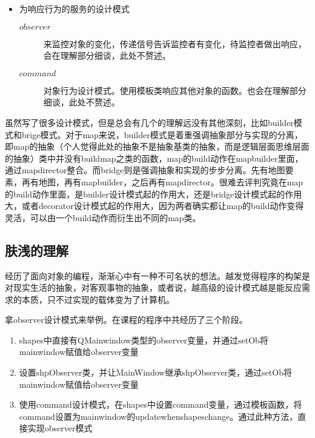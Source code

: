 \documentclass[a4paper,16pt,UTF8]{article}
\begin{document}
\begin{center}
\begin{itemize}
            \item 为响应行为的服务的设计模式
            \begin{description}
                \item[$observer$]来监控对象的变化，传递信号告诉监控者有变化，待监控者做出响应，会在理解部分细谈，此处不赘述。
                \item[$command$]对象行为设计模式。使用模板类响应其他对象的函数。也会在理解部分细谈，此处不赘述。
            \end{description}
        \end{itemize}
  
    \end{center}
    
    虽然写了很多设计模式，但是总会有几个的理解远没有其他深刻，比如builder模式和brige模式。对于map来说，builder模式是着重强调抽象部分与实现的分离，即map的抽象（个人觉得此处的抽象不是抽象基类的抽象，而是逻辑层面思维层面的抽象）类中并没有buildmap之类的函数，map的build动作在mapbuilder里面，通过mapdirector整合。而bridge则是强调抽象和实现的步步分离。先有地图要素，再有地图，再有mapbuilder，之后再有mapdirector。很难去评判究竟在map的build动作里面，是builder设计模式起的作用大，还是bridge设计模式起的作用大，或者decorator设计模式起的作用大，因为两者确实都让map的build动作变得灵活，可以由一个build动作而衍生出不同的map类。

    \subsection{\Large 肤浅的理解}

        经历了面向对象的编程，渐渐心中有一种不可名状的想法。越发觉得程序的构架是对现实生活的抽象，对客观事物的抽象，或者说，越高级的设计模式越是能反应需求的本质，只不过实现的载体变为了计算机。

        拿observer设计模式来举例。在课程的程序中共经历了三个阶段。
        \begin{enumerate}
            \item shapes中直接有QMainwindow类型的observer变量，并通过setOb将mainwindow赋值给observer变量
            \item 设置shpObserver类，并让MainWindow继承shpObserver类，通过setOb将mainwindow赋值给observer变量
            \item 使用command设计模式，在shapes中设置command变量，通过模板函数，将command设置为mainwindow的updatewhenshapeschange。通过此种方法，直接实现observer模式
        \end{enumerate}
\end{document}

